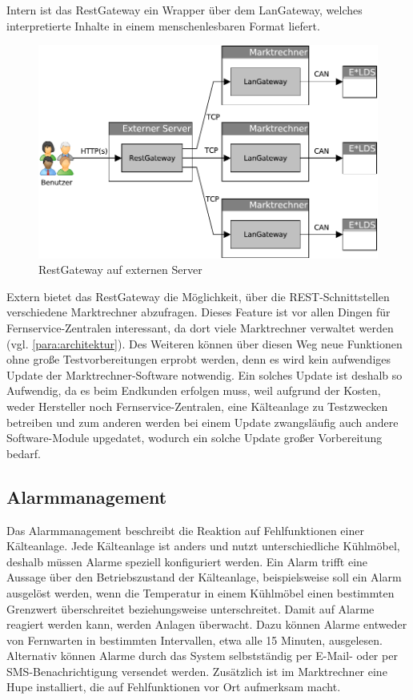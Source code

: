 \documentclass[11pt,a4paper]{report}
\begin{document}
Intern ist das RestGateway ein Wrapper über dem LanGateway, welches interpretierte Inhalte in einem menschenlesbaren Format liefert.

\begin{figure}[htbp]
\centering
\includegraphics[scale=0.7]{images/RestGateway_extern.pdf}
\caption[]{RestGateway auf externen Server}
\label{fig:rest_extern}
\end{figure}

Extern bietet das RestGateway die Möglichkeit, über die REST-Schnittstellen verschiedene Marktrechner abzufragen. Dieses Feature ist vor allen Dingen für Fernservice-Zentralen interessant, da dort viele Marktrechner verwaltet werden (vgl. \ref{para:architektur}). Des Weiteren können über diesen Weg neue Funktionen ohne große Testvorbereitungen erprobt werden, denn es wird kein aufwendiges Update der Marktrechner-Software notwendig. Ein solches Update ist deshalb so Aufwendig, da es beim Endkunden erfolgen muss, weil aufgrund der Kosten, weder Hersteller noch Fernservice-Zentralen, eine Kälteanlage zu Testzwecken betreiben und zum anderen werden bei einem Update zwangsläufig auch andere Software-Module upgedatet, wodurch ein solche Update großer Vorbereitung bedarf.

\subsection{Alarmmanagement} 

Das Alarmmanagement beschreibt die Reaktion auf Fehlfunktionen einer Kälteanlage. Jede Kälteanlage ist anders und nutzt unterschiedliche Kühlmöbel, deshalb müssen Alarme speziell konfiguriert werden. Ein Alarm trifft eine Aussage über den Betriebszustand der Kälteanlage, beispielsweise soll ein Alarm ausgelöst werden, wenn die Temperatur in einem Kühlmöbel einen bestimmten Grenzwert überschreitet beziehungsweise unterschreitet. Damit auf Alarme reagiert werden kann, werden Anlagen überwacht. Dazu können Alarme entweder von Fernwarten in bestimmten Intervallen, etwa alle 15 Minuten, ausgelesen. Alternativ können Alarme durch das System selbstständig per E-Mail- oder per SMS-Benachrichtigung versendet werden. Zusätzlich ist im Marktrechner eine Hupe installiert, die auf Fehlfunktionen vor Ort aufmerksam macht. 
\end{document}
